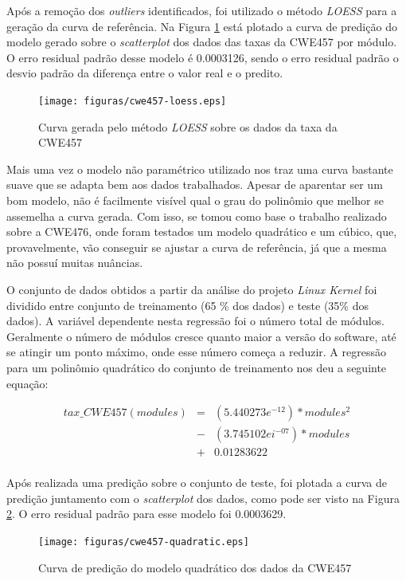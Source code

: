 Após a remoção dos \textit{outliers} identificados, foi utilizado o método
\textit{LOESS} para a geração da curva de referência. Na Figura
\ref{fig:cwe457-loess} está plotado a curva de predição do modelo gerado sobre o
\textit{scatterplot} dos dados das taxas da CWE457 por módulo. O erro residual
padrão desse modelo é 0.0003126, sendo o erro residual padrão o desvio padrão da
diferença entre o valor real e o predito.

\begin{figure}[h]
  \centering
  \texttt{[image: figuras/cwe457-loess.eps]}
      \caption{Curva gerada pelo método \textit{LOESS} sobre os dados da taxa da CWE457}
  \label{fig:cwe457-loess}
\end{figure}

Mais uma vez o modelo não paramétrico utilizado nos traz uma curva bastante
suave que se adapta bem aos dados trabalhados. Apesar de aparentar ser um bom
modelo, não é facilmente visível qual o grau do polinômio que melhor se
assemelha a curva gerada. Com isso, se tomou como base o trabalho realizado
sobre a CWE476, onde foram testados um modelo quadrático e um cúbico, que,
provavelmente, vão conseguir se ajustar a curva de referência, já que a mesma não
possuí muitas nuâncias.

O conjunto de dados obtidos a partir da análise do projeto \textit{Linux Kernel}
foi dividido entre conjunto de treinamento (65 \% dos dados) e teste (35\% dos
dados). A variável dependente nesta regressão foi o número total de módulos.
Geralmente o número de módulos cresce quanto maior a versão do software, até se
atingir um ponto máximo, onde esse número começa a reduzir. A regressão para um
polinômio quadrático do conjunto de treinamento nos deu a seguinte equação:

\begin{align*}
 tax\_CWE457(modules) &=& (5.440273e^{-12}) * modules^{2} \\
                      &-& (3.745102ei^{-07}) * modules \\
                      &+& 0.01283622 \\
\end{align*}

Após realizada uma predição sobre o conjunto de teste, foi plotada a curva de
predição juntamento com o \textit{scatterplot} dos dados, como pode ser visto na
Figura \ref{fig:cwe457-quadratic}. O erro residual padrão para esse modelo foi
0.0003629.

\begin{figure}[h]
  \centering
  \texttt{[image: figuras/cwe457-quadratic.eps]}
      \caption{Curva de predição do modelo quadrático dos dados da CWE457}
  \label{fig:cwe457-quadratic}
\end{figure}

